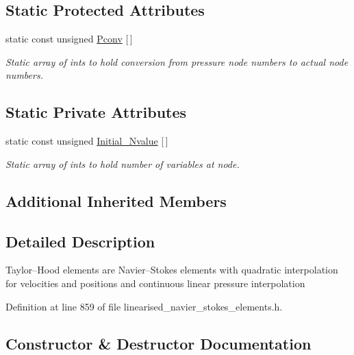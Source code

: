 \subsection*{Static Protected Attributes}
\begin{DoxyCompactItemize}
\item 
static const unsigned \hyperlink{classoomph_1_1LinearisedQTaylorHoodElement_ab3be53133596f00d3f97f4939ed57bbc}{Pconv} \mbox{[}$\,$\mbox{]}
\begin{DoxyCompactList}\small\item\em Static array of ints to hold conversion from pressure node numbers to actual node numbers. \end{DoxyCompactList}\end{DoxyCompactItemize}
\subsection*{Static Private Attributes}
\begin{DoxyCompactItemize}
\item 
static const unsigned \hyperlink{classoomph_1_1LinearisedQTaylorHoodElement_a0b73e05a76c322bbe36d50084c9741da}{Initial\+\_\+\+Nvalue} \mbox{[}$\,$\mbox{]}
\begin{DoxyCompactList}\small\item\em Static array of ints to hold number of variables at node. \end{DoxyCompactList}\end{DoxyCompactItemize}
\subsection*{Additional Inherited Members}


\subsection{Detailed Description}
Taylor--Hood elements are Navier--Stokes elements with quadratic interpolation for velocities and positions and continuous linear pressure interpolation 

Definition at line 859 of file linearised\+\_\+navier\+\_\+stokes\+\_\+elements.\+h.



\subsection{Constructor \& Destructor Documentation}
\mbox{\label{classoomph_1_1LinearisedQTaylorHoodElement_ad12c05ff1bac20a6e7d344df2ab064a0}} 
